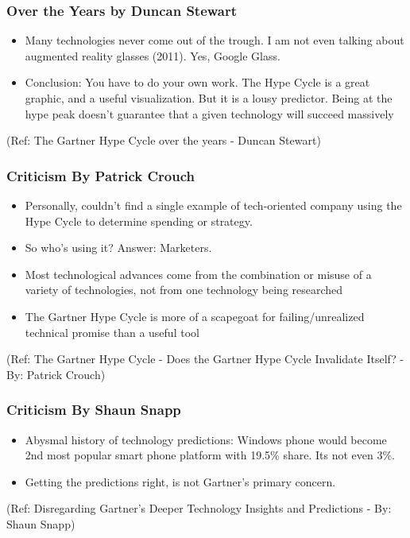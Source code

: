 \begin{frame}[fragile]\frametitle{Over the Years by Duncan Stewart}


\begin{itemize}
\item Many technologies never come out of the trough. I am not even talking about augmented reality glasses (2011). Yes, Google Glass.

\item Conclusion: You have to do your own work. The Hype Cycle is a great graphic, and a useful visualization. But it is a lousy predictor. Being at the hype peak doesn’t guarantee that a given technology will succeed massively
\end{itemize}

{\tiny (Ref: The Gartner Hype Cycle over the years - Duncan Stewart)}


\end{frame}

\begin{frame}[fragile]\frametitle{Criticism By Patrick Crouch}


\begin{itemize}
\item Personally, couldn’t find a single example of tech-oriented company using the Hype Cycle to determine spending or strategy.
\item So who’s using it? Answer: Marketers.
\item Most technological advances come from the combination or misuse of a variety of technologies, not from one technology being researched
\item The Gartner Hype Cycle is more of a scapegoat for failing/unrealized technical promise than a useful tool

\end{itemize}

{\tiny (Ref: The Gartner Hype Cycle - Does the Gartner Hype Cycle Invalidate Itself? - By: Patrick Crouch)}

\end{frame}

\begin{frame}[fragile]\frametitle{Criticism By Shaun Snapp}


\begin{itemize}
\item Abysmal history of technology predictions: Windows phone would become 2nd most popular smart phone platform with 19.5\% share. Its not even 3\%.
\item Getting the predictions right, is not Gartner's primary concern.

\end{itemize}

{\tiny (Ref: Disregarding Gartner's Deeper Technology Insights and Predictions - By: Shaun Snapp)}

\end{frame}


